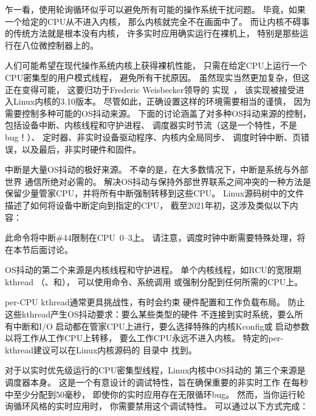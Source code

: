 乍一看，使用轮询循环似乎可以避免所有可能的操作系统干扰问题。
毕竟，如果一个给定的CPU从不进入内核，
那么内核就完全不在画面中了。
而让内核不碍事的传统方法就是根本没有内核，
许多实时应用确实运行在裸机上，
特别是那些运行在八位微控制器上的。

人们可能希望在现代操作系统内核上获得裸机性能，
只需在给定CPU上运行一个CPU密集型的用户模式线程，
避免所有干扰原因。
虽然现实当然更加复杂，但这正在变得可能，
这要归功于Frederic Weisbecker领导的
实现~\cite{JonCorbet2013NO-HZ-FULL,FredericWeisbecker2013nohz}，
该实现被接受进入Linux内核的3.10版本。
尽管如此，正确设置这样的环境需要相当的谨慎，
因为需要控制多种可能的OS抖动来源。
下面的讨论涵盖了对多种OS抖动来源的控制，
包括设备中断、内核线程和守护进程、
调度器实时节流（这是一个特性，不是bug！）、
定时器、非实时设备驱动程序、内核内全局同步、
调度时钟中断、页错误，以及最后，非实时硬件和固件。

中断是大量OS抖动的极好来源。
不幸的是，在大多数情况下，中断是系统与外部世界
通信所绝对必需的。
解决OS抖动与保持外部世界联系之间冲突的一种方法是
保留少量管家CPU，并将所有中断强制转移到这些CPU。
Linux源码树中的文件
描述了如何将设备中断定向到指定的CPU，
截至2021年初，这涉及类似以下内容：


此命令将中断\#44限制在CPU~0--3上。
请注意，调度时钟中断需要特殊处理，将在本节后面讨论。

OS抖动的第二个来源是内核线程和守护进程。
单个内核线程，如RCU的宽限期kthread
（、和），
可以使用命令、系统调用
或强制分配到任何所需的CPU上。

per-CPU kthread通常更具挑战性，有时会约束
硬件配置和工作负载布局。
防止这些kthread产生OS抖动要求：要么某些类型的硬件
不连接到实时系统，要么所有中断和I/O
启动都在管家CPU上进行，要么选择特殊的内核Kconfig或
启动参数以将工作从工作CPU上转移，
要么工作CPU永远不进入内核。
特定的per-kthread建议可以在Linux内核源码的
目录中
找到。

对于以实时优先级运行的CPU密集型线程，Linux内核中OS抖动的
第三个来源是调度器本身。
这是一个有意设计的调试特性，旨在确保重要的非实时工作
在每秒中至少分配到50毫秒，
即使你的实时应用存在无限循环bug。
然而，当你运行轮询循环风格的实时应用时，
你需要禁用这个调试特性。
可以通过以下方式完成：

